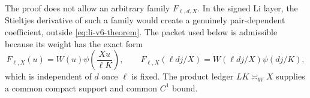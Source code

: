 \begin{remark}
The proof does not allow an arbitrary family $F_{\ell,d,X}$.  In the
signed Li layer, the Stieltjes derivative of such a family would create
a genuinely pair-dependent coefficient, outside
\eqref{eq:li-v6-theorem}.  The packet used below is admissible because
its weight has the exact form
\begin{equation}
 F_{\ell,X}(u)
 =W(u)\psi\!\left(\frac{Xu}{\ell K}\right),
 \qquad
 F_{\ell,X}(\ell dj/X)
 =W(\ell dj/X)\psi(dj/K),
 \label{eq:one-factor-weight-identity}
\end{equation}
which is independent of $d$ once $\ell$ is fixed.  The product ledger
$LK\asymp_WX$ supplies a common compact support and common $C^1$ bound.
\end{remark}
